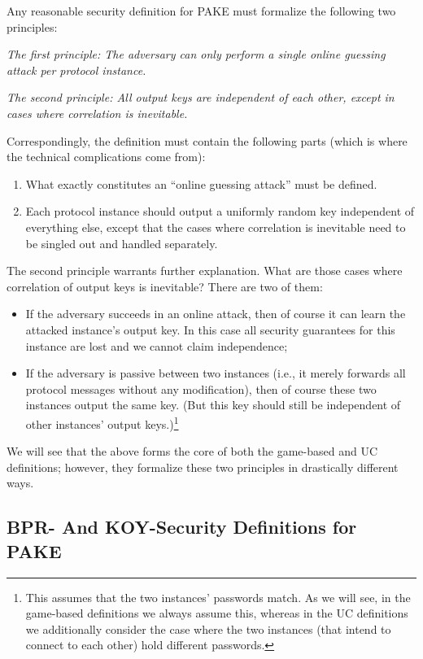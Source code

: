 \documentclass{article}
\begin{document}
Any reasonable security definition for PAKE must formalize the following two principles:
\begin{framed}
\begin{displayquote}
  \emph{The first principle: The adversary can only perform a single online guessing attack per protocol instance.}
  
  \emph{The second principle: All output keys are independent of each other, except in cases where correlation is inevitable.}
\end{displayquote}
\end{framed}
Correspondingly, the definition must contain the following parts (which is where the technical complications come from):
\begin{enumerate}
  \item What exactly constitutes an ``online guessing attack'' must be defined.
  \item Each protocol instance should output a uniformly random key independent of everything else, except that the cases where correlation is inevitable need to be singled out and handled separately. 
\end{enumerate}

The second principle warrants further explanation. What are those cases where correlation of output keys is inevitable? There are two of them:
\begin{itemize}
  \item If the adversary succeeds in an online attack, then of course it can learn the attacked instance's output key. In this case all security guarantees for this instance are lost and we cannot claim independence;
  \item If the adversary is passive between two instances (i.e., it merely forwards all protocol messages without any modification), then of course these two instances output the same key. (But this key should still be independent of other instances' output keys.)\footnote{This assumes that the two instances' passwords match. As we will see, in the game-based definitions we always assume this, whereas in the UC definitions we additionally consider the case where the two instances (that intend to connect to each other) hold different passwords.}
\end{itemize}

We will see that the above forms the core of both the game-based and UC definitions; however, they formalize these two principles in drastically different ways.
\subsection{BPR- And KOY-Security Definitions for PAKE}
\end{document}
